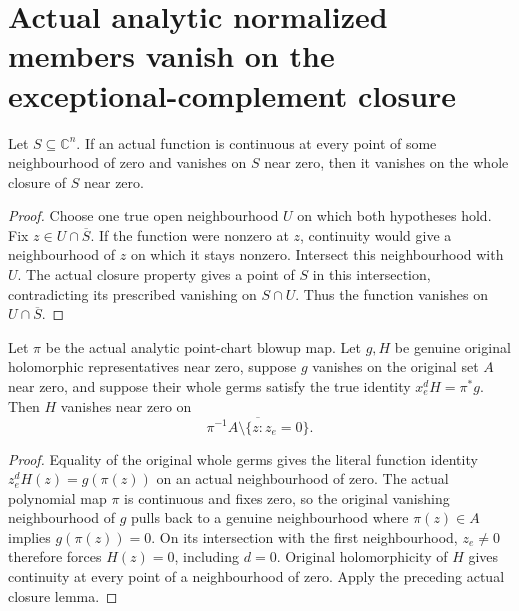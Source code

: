\section{Actual analytic normalized members vanish on the exceptional-complement closure}

\begin{lemma}
\label{hir:actual-local-continuous-vanishing-closure}
\leanok
Let $S\subseteq\mathbb C^n$. If an actual function is continuous at every
point of some neighbourhood of zero and vanishes on $S$ near zero,
then it vanishes on the whole closure of $S$ near zero.
\end{lemma}
\begin{proof}
Choose one true open neighbourhood $U$ on which both hypotheses hold.
Fix $z\in U\cap\overline S$. If the function were nonzero at $z$,
continuity would give a neighbourhood of $z$ on which it stays nonzero.
Intersect this neighbourhood with $U$. The actual closure property gives
a point of $S$ in this intersection, contradicting its prescribed
vanishing on $S\cap U$. Thus the function vanishes on $U\cap\overline S$.
\end{proof}

\begin{theorem}
\label{hir:actual-point-quotient-vanishing-exceptional-complement-closure}
\leanok
Let $\pi$ be the actual analytic point-chart blowup map. Let $g,H$ be
genuine original holomorphic representatives near zero, suppose $g$
vanishes on the original set $A$ near zero, and suppose their whole germs
satisfy the true identity $x_e^dH=\pi^*g$. Then $H$ vanishes near zero on
\[
 \overline{\pi^{-1}A\setminus\{z:z_e=0\}}.
\]
\end{theorem}
\begin{proof}
Equality of the original whole germs gives the literal function identity
$z_e^dH(z)=g(\pi(z))$ on an actual neighbourhood of zero. The actual
polynomial map $\pi$ is continuous and fixes zero, so the original
vanishing neighbourhood of $g$ pulls back to a genuine neighbourhood
where $\pi(z)\in A$ implies $g(\pi(z))=0$. On its intersection with the
first neighbourhood, $z_e\ne0$ therefore forces $H(z)=0$, including
$d=0$. Original holomorphicity of $H$ gives continuity at every point
of a neighbourhood of zero. Apply the preceding actual closure lemma.
\end{proof}

